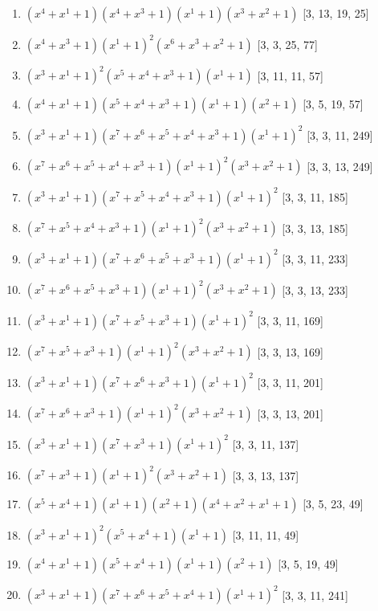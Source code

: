 \documentclass[10pt,twocolumn]{article}
\begin{document}
\begin{enumerate}
\item $(x^{4} + x^{1} + 1)(x^{4} + x^{3} + 1)(x^{1} + 1)(x^{3} + x^{2} + 1)$  [3, 13, 19, 25]
\item $(x^{4} + x^{3} + 1)(x^{1} + 1)^{2}(x^{6} + x^{3} + x^{2} + 1)$  [3, 3, 25, 77]
\item $(x^{3} + x^{1} + 1)^{2}(x^{5} + x^{4} + x^{3} + 1)(x^{1} + 1)$  [3, 11, 11, 57]
\item $(x^{4} + x^{1} + 1)(x^{5} + x^{4} + x^{3} + 1)(x^{1} + 1)(x^{2} + 1)$  [3, 5, 19, 57]
\item $(x^{3} + x^{1} + 1)(x^{7} + x^{6} + x^{5} + x^{4} + x^{3} + 1)(x^{1} + 1)^{2}$  [3, 3, 11, 249]
\item $(x^{7} + x^{6} + x^{5} + x^{4} + x^{3} + 1)(x^{1} + 1)^{2}(x^{3} + x^{2} + 1)$  [3, 3, 13, 249]
\item $(x^{3} + x^{1} + 1)(x^{7} + x^{5} + x^{4} + x^{3} + 1)(x^{1} + 1)^{2}$  [3, 3, 11, 185]
\item $(x^{7} + x^{5} + x^{4} + x^{3} + 1)(x^{1} + 1)^{2}(x^{3} + x^{2} + 1)$  [3, 3, 13, 185]
\item $(x^{3} + x^{1} + 1)(x^{7} + x^{6} + x^{5} + x^{3} + 1)(x^{1} + 1)^{2}$  [3, 3, 11, 233]
\item $(x^{7} + x^{6} + x^{5} + x^{3} + 1)(x^{1} + 1)^{2}(x^{3} + x^{2} + 1)$  [3, 3, 13, 233]
\item $(x^{3} + x^{1} + 1)(x^{7} + x^{5} + x^{3} + 1)(x^{1} + 1)^{2}$  [3, 3, 11, 169]
\item $(x^{7} + x^{5} + x^{3} + 1)(x^{1} + 1)^{2}(x^{3} + x^{2} + 1)$  [3, 3, 13, 169]
\item $(x^{3} + x^{1} + 1)(x^{7} + x^{6} + x^{3} + 1)(x^{1} + 1)^{2}$  [3, 3, 11, 201]
\item $(x^{7} + x^{6} + x^{3} + 1)(x^{1} + 1)^{2}(x^{3} + x^{2} + 1)$  [3, 3, 13, 201]
\item $(x^{3} + x^{1} + 1)(x^{7} + x^{3} + 1)(x^{1} + 1)^{2}$  [3, 3, 11, 137]
\item $(x^{7} + x^{3} + 1)(x^{1} + 1)^{2}(x^{3} + x^{2} + 1)$  [3, 3, 13, 137]
\item $(x^{5} + x^{4} + 1)(x^{1} + 1)(x^{2} + 1)(x^{4} + x^{2} + x^{1} + 1)$  [3, 5, 23, 49]
\item $(x^{3} + x^{1} + 1)^{2}(x^{5} + x^{4} + 1)(x^{1} + 1)$  [3, 11, 11, 49]
\item $(x^{4} + x^{1} + 1)(x^{5} + x^{4} + 1)(x^{1} + 1)(x^{2} + 1)$  [3, 5, 19, 49]
\item $(x^{3} + x^{1} + 1)(x^{7} + x^{6} + x^{5} + x^{4} + 1)(x^{1} + 1)^{2}$  [3, 3, 11, 241]

\end{enumerate}
\end{document}
